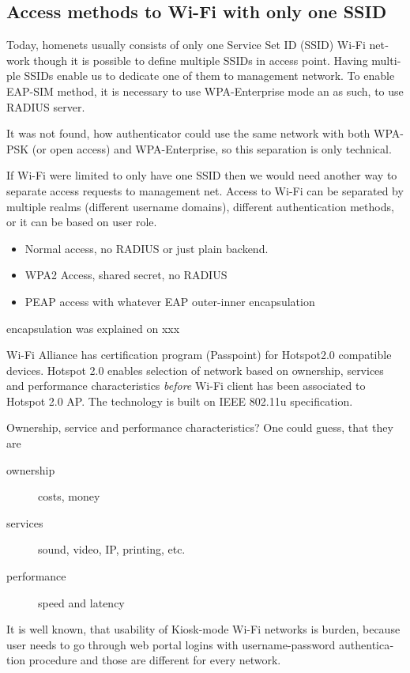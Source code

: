 \documentclass[12pt,a4paper,english]{tutthesis}
\begin{document}
\begin{otherlanguage}{english}
\section{Access methods to Wi-Fi with only one SSID}
\label{sec-4-4}
Today, homenets usually consists of only one Service Set ID (SSID)
Wi-Fi network though it is possible to define multiple SSIDs in
access point. Having multiple SSIDs enable us to dedicate one of them
to management network. 
To enable EAP-SIM method, it is necessary to use WPA-Enterprise mode
an as such, to use RADIUS server.

It was not found, how authenticator could use the same network with
both WPA-PSK (or open access) and WPA-Enterprise, so
this separation is only technical.


If Wi-Fi were limited to only have one SSID then we would need another way
to separate access requests to management net.  Access to Wi-Fi can be
separated by multiple realms (different username domains), different
authentication methods, or it can be based on user role.
\begin{itemize}
\item Normal access, no RADIUS or just plain backend.
\item WPA2 Access, shared secret, no RADIUS
\item PEAP access with whatever EAP outer-inner encapsulation
\end{itemize}
encapsulation was explained on xxx





Wi-Fi Alliance has certification program (Passpoint) for Hotspot2.0 compatible
devices.  Hotspot 2.0 enables selection of network based on ownership,
services and performance characteristics \emph{before} Wi-Fi client has
been associated to Hotspot 2.0 AP. The technology is built on
IEEE 802.11u specification.


Ownership, service and performance characteristics?
One could guess, that they are
\begin{description}
\item[{ownership}] costs, money
\item[{services}] sound, video, IP, printing, etc.
\item[{performance}] speed and latency
\end{description}

It is well known, that usability of Kiosk-mode Wi-Fi
 networks is burden, because user needs to go through 
web portal logins with username-password authentication 
procedure and those are different for every network.


\end{otherlanguage}
\end{document}
